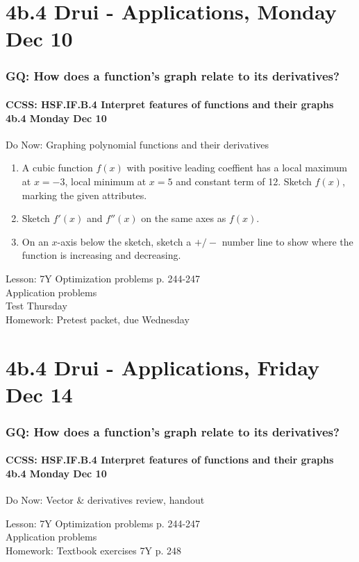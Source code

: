 \documentclass{beamer}
\begin{document}
\section{4b.4 Drui - Applications, Monday Dec 10}
  \frame
  {\frametitle{GQ: How does a function's graph relate to its derivatives?}
    \framesubtitle{CCSS: HSF.IF.B.4 Interpret features of functions and their graphs \quad \alert{4b.4 Monday Dec 10}}

    \begin{block}{Do Now: Graphing polynomial functions and their derivatives}
      \begin{enumerate}
        \item A cubic function $f(x)$ with positive leading coeffient has a local maximum at $x=-3$, local minimum at $x=5$ and constant term of 12. Sketch $f(x)$, marking the given attributes.
        \item Sketch $f'(x)$ and $f''(x)$ on the same axes as $f(x)$.
        \item On an $x$-axis below the sketch, sketch a $+/-$ number line to show where the function is increasing and decreasing.
      \end{enumerate}
    \end{block}
    Lesson: 7Y Optimization problems p. 244-247\\
    Application problems\\
    \alert{Test Thursday} \\
    Homework: Pretest packet, due Wednesday
  }

\section{4b.4 Drui - Applications, Friday Dec 14}
  \frame
  {\frametitle{GQ: How does a function's graph relate to its derivatives?}
    \framesubtitle{CCSS: HSF.IF.B.4 Interpret features of functions and their graphs \quad \alert{4b.4 Monday Dec 10}}

    \begin{block}{Do Now:  Vector \& derivatives review, handout}
    \end{block}
    Lesson: 7Y Optimization problems p. 244-247\\
    Application problems\\ \bigskip
    Homework: Textbook exercises 7Y p. 248
  }
\end{document}
